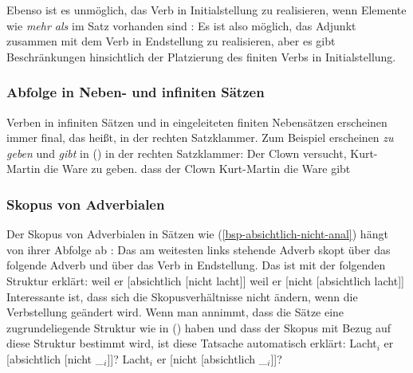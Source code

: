 Ebenso ist es unmöglich, das Verb in Initialstellung zu realisieren, wenn Elemente wie
\emph{mehr als} im Satz vorhanden sind \parencites[Abschnitt~3.1]{Haider97c}[]{Meinunger2001a}:
\eal
{}
\zl
%
Es ist also möglich, das Adjunkt zusammen mit dem Verb in Endstellung zu realisieren, aber es gibt
Beschränkungen hinsichtlich der Platzierung des finiten Verbs in Initialstellung.

\subsubsection{Abfolge in Neben- und infiniten Sätzen}

Verben in infiniten Sätzen und in eingeleiteten finiten Nebensätzen
  erscheinen immer final, das heißt, in der rechten Satzklammer. Zum Beispiel erscheinen \emph{zu geben}
  und \emph{gibt} in () in der rechten Satzklammer:
\eal
\ex 
Der Clown versucht, Kurt-Martin die Ware zu geben.
\ex 
dass der Clown Kurt-Martin die Ware gibt
\zl

\subsubsection{Skopus von Adverbialen}

Der Skopus von Adverbialen in Sätzen wie (\ref{bsp-absichtlich-nicht-anal}) hängt von ihrer Abfolge ab \citep[Abschnitt~2.3]{Netter92}:
Das am weitesten links stehende Adverb skopt über das folgende Adverb und über das Verb in
Endstellung. Das ist mit der folgenden Struktur erklärt:
\eal
\label{bsp-absichtlich-nicht-anal}
\ex 
weil er  [absichtlich [nicht lacht]]
\ex 
weil er [nicht [absichtlich lacht]]
\zl
Interessante ist, dass sich die Skopusverhältnisse nicht ändern, wenn die Verbstellung geändert wird. Wenn
man annimmt, dass die Sätze eine zugrundeliegende Struktur wie in () haben und dass der Skopus
mit Bezug auf diese Struktur bestimmt wird, ist diese Tatsache automatisch erklärt:
\eal
\label{bsp-absichtlich-nicht-anal-v1}
\ex 
Lacht$_i$ er [absichtlich [nicht \_$_i$]]?
\ex 
Lacht$_i$ er [nicht [absichtlich \_$_i$]]?
\zl
\nocite{Hoehle88a,Hoehle97a}

